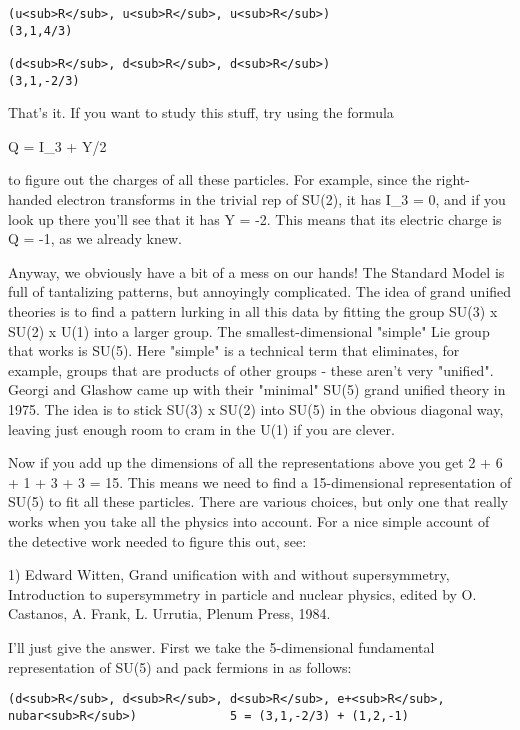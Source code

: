 \begin{verbatim}
(u<sub>R</sub>, u<sub>R</sub>, u<sub>R</sub>)                             (3,1,4/3) 

(d<sub>R</sub>, d<sub>R</sub>, d<sub>R</sub>)                             (3,1,-2/3)
\end{verbatim}
    
That's it.  If you want to study this stuff, try using the formula

Q = I_{3} + Y/2

to figure out the charges of all these particles.  For example, since
the right-handed electron transforms in the trivial rep of SU(2), it
has I_{3} = 0, and if you look up there you'll see that it has Y = -2.
This means that its electric charge is Q = -1, as we already knew.  

Anyway, we obviously have a bit of a mess on our hands!  The Standard
Model is full of tantalizing patterns, but annoyingly complicated.
The idea of grand unified theories is to find a pattern lurking in all
this data by fitting the group SU(3) x SU(2) x U(1) into a larger
group.  The smallest-dimensional "simple" Lie group that works is
SU(5).  Here "simple" is a technical term that eliminates, for
example, groups that are products of other groups - these aren't very
"unified".  Georgi and Glashow came up with their "minimal" SU(5)
grand unified theory in 1975.  The idea is to stick SU(3) x SU(2) into
SU(5) in the obvious diagonal way, leaving just enough room to cram in
the U(1) if you are clever.

Now if you add up the dimensions of all the representations above you
get 2 + 6 + 1 + 3 + 3 = 15.  This means we need to find a
15-dimensional representation of SU(5) to fit all these particles.
There are various choices, but only one that really works when you
take all the physics into account.  For a nice simple account of the
detective work needed to figure this out, see:

1) Edward Witten, Grand unification with and without supersymmetry,
Introduction to supersymmetry in particle and nuclear physics, edited by
O. Castanos, A. Frank, L. Urrutia, Plenum Press, 1984.

I'll just give the answer.  First we take the 5-dimensional fundamental
representation of SU(5) and pack fermions in as follows:

\begin{verbatim}
(d<sub>R</sub>, d<sub>R</sub>, d<sub>R</sub>, e+<sub>R</sub>, nubar<sub>R</sub>)             5 = (3,1,-2/3) + (1,2,-1)

\end{verbatim}
    

